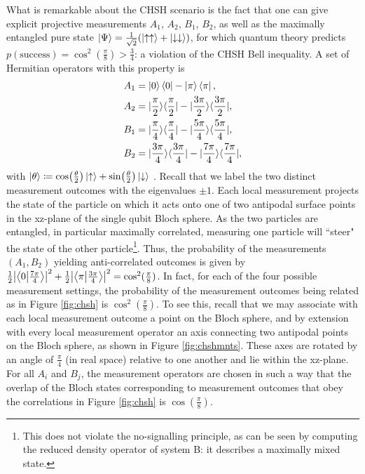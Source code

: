 What is remarkable about the CHSH scenario is the fact that one can give explicit projective measurements $A_{1}$, $A_{2}$, $B_{1}$, $B_{2}$, as well as the maximally entangled pure state ${\ket{\Psi} =\frac{1}{\sqrt{2}}(\ket{\uparrow\uparrow} +\ket{\downarrow\downarrow})}$, for which quantum theory predicts $p(\text{{success}})=\cos^{2}(\frac{\pi}{8})>\frac{3}{4}$: a violation of the CHSH Bell inequality. A set of Hermitian operators with this property is 
\begin{equation}
\label{eqn:chshmnts}
\begin{split}
A_{1} & =\ket{0}\bra{0}-\ket{\pi}\bra{\pi},\\
A_{2} & =|\frac{\pi}{2}\rangle\langle\frac{\pi}{2}|-|\frac{3\pi}{2}\rangle\langle\frac{3\pi}{2}|,\\
B_{1} & =|\frac{\pi}{4}\rangle\langle\frac{\pi}{4}|-|\frac{5\pi}{4}\rangle\langle\frac{5\pi}{4}|,\\
B_{2} & =|\frac{3\pi}{4}\rangle\langle\frac{3\pi}{4}|-|\frac{7\pi}{4}\rangle\langle\frac{7\pi}{4}|,
\end{split}
\end{equation}
with $\ket{\theta} \coloneqq\cos(\frac{\theta}{2})\ket{\uparrow} +\sin(\frac{\theta}{2})\ket{\downarrow}$ \cite{Colbeck2019}. Recall that we label the two distinct measurement outcomes with the eigenvalues $\pm 1$. Each local measurement projects the state of the particle on which it acts onto one of two antipodal surface points in the xz-plane of the single qubit Bloch sphere. As the two particles are entangled, in particular maximally correlated, measuring one particle will ``steer" the state of the other particle\footnote{This does not violate the no-signalling principle, as can be seen by computing the reduced density operator of system B: it describes a maximally mixed state.}. Thus, the probability of the measurements $(A_1,B_2)$ yielding anti-correlated outcomes is given by $\frac{1}{2}\abs{\bra{0}\ket{\frac{7\pi}{4}}}^2+\frac{1}{2}\abs{\bra{\pi}\ket{\frac{3\pi}{4}}}^2=\cos^2(\frac{\pi}{8})$. In fact, for each of the four possible measurement settings, the probability of the measurement outcomes being related as in Figure \ref{fig:chsh} is $\cos^2(\frac{\pi}{8})$. To see this, recall that we may associate with each local measurement outcome a point on the Bloch sphere, and by extension with every local measurement operator an axis connecting two antipodal points on the Bloch sphere, as shown in Figure \ref{fig:chshmnts}. These axes are rotated by an angle of $\frac{\pi}{4}$ (in real space) relative to one another and lie within the xz-plane. For all $A_i$ and $B_j$, the measurement operators are chosen in such a way that the overlap of the Bloch states corresponding to measurement outcomes that obey the correlations in Figure \ref{fig:chsh} is $\cos(\frac{\pi}{8})$.

